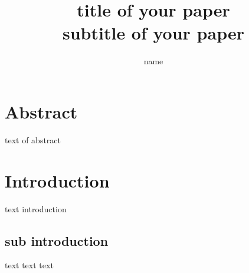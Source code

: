 \documentclass[10pt, fullpage, a4paper, titlepage]{article}
\title{title of your paper\\ \small subtitle of your paper}
\author{name}
\date{}
\begin{document}
\maketitle
\newpage

\section*{Abstract}

text of abstract

\section{Introduction}
text introduction

\subsection{sub introduction}
text text text
\end{document}
